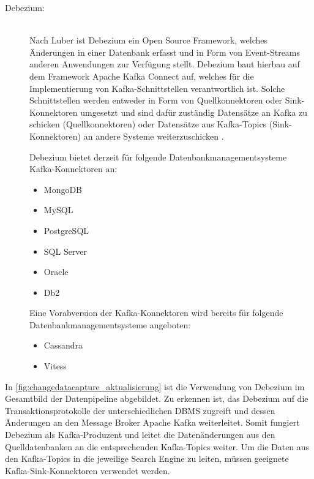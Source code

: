 \begin{description}
\item[Debezium:]\hfill \\
    Nach Luber \cite{StefanLuber.2021} ist Debezium ein Open Source Framework, welches Änderungen in einer Datenbank erfasst und in Form von Event-Streams anderen Anwendungen zur Verfügung stellt. Debezium baut hierbau auf dem Framework \glqq Apache Kafka Connect\grqq{} auf, welches für die Implementierung von Kafka-Schnittstellen verantwortlich ist. Solche Schnittstellen werden entweder in Form von Quellkonnektoren oder Sink-Konnektoren umgesetzt und sind dafür zuständig Datensätze an Kafka zu schicken (Quellkonnektoren) oder Datensätze aus Kafka-Topics (Sink-Konnektoren) an andere Systeme weiterzuschicken \cite{DebeziumCommunity.2021b}.
    
    Debezium bietet derzeit für folgende Datenbankmanagementsysteme Kafka-Konnektoren an: \cite{DebeziumCommunity.2021}

    \begin{itemize}
        \item MongoDB
        \item MySQL
        \item PostgreSQL
        \item SQL Server
        \item Oracle
        \item Db2
    \end{itemize}

    Eine Vorabversion der Kafka-Konnektoren wird bereits für folgende Datenbankmanagementsysteme angeboten: \cite{DebeziumCommunity.2021}

    \begin{itemize}
        \item Cassandra
        \item Vitess
    \end{itemize}

\end{description}

In \autoref{fig:changedatacapture_aktualisierung} ist die Verwendung von Debezium im Gesamtbild der Datenpipeline abgebildet. Zu erkennen ist, das Debezium auf die Transaktionsprotokolle der unterschiedlichen DBMS zugreift und dessen Änderungen an den Message Broker Apache Kafka weiterleitet. Somit fungiert Debezium als Kafka-Produzent und leitet die Datenänderungen aus den Quelldatenbanken an die entsprechenden Kafka-Topics weiter. Um die Daten aus den Kafka-Topics in die jeweilige Search Engine zu leiten, müssen geeignete Kafka-Sink-Konnektoren verwendet werden.

